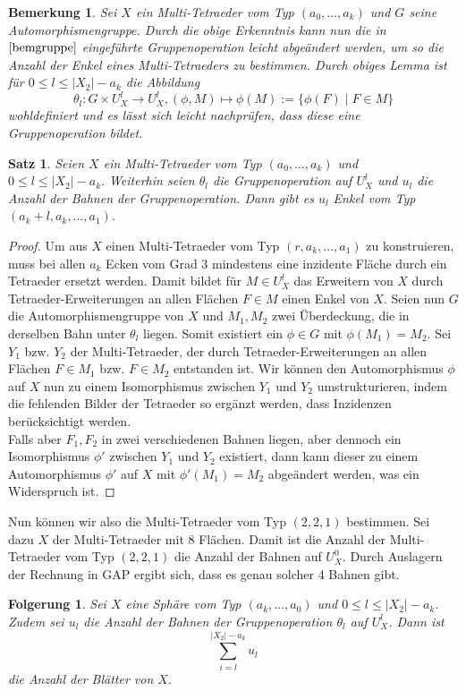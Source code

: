 \documentclass[12pt,titlepage,twoside,cleardoublepage]{article}
\theoremstyle{nummermitklammern}
\newtheorem{folgerung}[temp]{Folgerung}
\newtheorem{bemerkung}[temp]{Bemerkung}
\newtheorem{satz}[temp]{Satz}
\newtheorem{folgerung}[zahl]{Folgerung}
\newtheorem{bemerkung}[zahl]{Bemerkung}
\newtheorem{satz}[zahl]{Satz}
\numberwithin{equation}{section}
\begin{document}
\begin{bemerkung}
Sei $X$ ein Multi-Tetraeder vom Typ $(a_0,\ldots ,a_k)$ und $G$ seine Automorphismengruppe.
Durch die obige Erkenntnis kann nun die in $\Cref{bemgruppe}$ eingeführte Gruppenoperation leicht abgeändert werden, um so die Anzahl der Enkel eines Multi-Tetraeders zu bestimmen. Durch obiges Lemma ist für $0\leq l\leq \vert X_2 \vert -a_k$ die Abbildung
\[
\theta_l: G\times U_X^l \to U_X^l, (\phi, M)\mapsto \phi(M):=\{\phi(F)\mid F\in M\}
\] 
wohldefiniert und es lässt sich leicht nachprüfen, dass diese eine Gruppenoperation bildet.
\end{bemerkung}
\begin{satz}
Seien $X$ ein Multi-Tetraeder vom Typ $(a_0,\ldots,a_k)$ und $0\leq l\leq \vert X_2\vert -a_k.$ Weiterhin seien $\theta_l$ die Gruppenoperation auf $U_X^l$ und $u_l$ die Anzahl der Bahnen der Gruppenoperation. Dann gibt es $u_l$ Enkel vom Typ $(a_k+l,a_k,\ldots,a_1).$
\end{satz}
\begin{proof}
Um aus $X$ einen Multi-Tetraeder vom Typ $(r,a_k,\ldots,a_1)$ zu konstruieren, muss bei allen $a_k$ Ecken vom Grad 3 mindestens eine inzidente Fläche durch ein Tetraeder ersetzt werden. Damit bildet für $M\in U_X^l$ das Erweitern von $X$ durch Tetraeder-Erweiterungen an allen Flächen $F\in M$ einen Enkel von $X$. Seien nun $G$ die Automorphismengruppe von $X$ und $M_1,M_2$ zwei Überdeckung, die in derselben Bahn unter $\theta_l$ liegen. Somit existiert ein $\phi \in G$ mit $\phi(M_1)=M_2.$ Sei $Y_1$ bzw. $Y_2$ der Multi-Tetraeder, der durch Tetraeder-Erweiterungen an allen Flächen $F\in M_1$ bzw. $F \in M_2$ entstanden ist. Wir können den Automorphismus $\phi$ auf $X$ nun zu einem Isomorphismus zwischen $Y_1$ und $Y_2$ umstrukturieren, indem die fehlenden Bilder der Tetraeder so ergänzt werden, dass Inzidenzen berücksichtigt werden. \\
Falls aber $F_1,F_2$ in zwei verschiedenen Bahnen liegen, aber dennoch ein Isomorphismus $\phi'$ zwischen $Y_1$ und $Y_2$ existiert, dann kann dieser zu einem Automorphismus $\phi'$ auf $X$ mit $\phi'(M_1)=M_2$ abgeändert werden, was ein Widerspruch ist.
\end{proof}
Nun können wir also die Multi-Tetraeder vom Typ $(2,2,1)$ bestimmen. Sei dazu $X$ der Multi-Tetraeder mit 8 Flächen.
Damit ist die Anzahl der Multi-Tetraeder vom Typ $(2,2,1)$ die Anzahl der Bahnen auf $U^0_X.$ Durch Auslagern der Rechnung in GAP ergibt sich, dass es genau solcher 4 Bahnen gibt.
\begin{folgerung}
Sei $X$ eine Sphäre vom Typ $(a_k,\ldots, a_0)$ und $0\leq l\leq \vert X_2\vert -a_k.$ Zudem sei $u_l$ die Anzahl der Bahnen der Gruppenoperation $\theta_l$ auf $U_X^l$. Dann ist 
\[
\sum_{i=l}^{\vert X_2\vert -a_k} u_l
\] die Anzahl der Blätter von $X.$
\end{folgerung}
\end{document}
